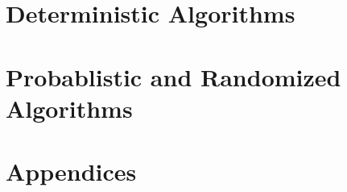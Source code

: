 \documentclass[11pt]{book}
\title{\Title}
\date{}
\author{\Authors}
\theoremstyle{definition}
\begin{document}
\maketitle
\tableofcontents

\part{Deterministic Algorithms}
\begin{multicols}{2}
\end{multicols}

\part{Probablistic and Randomized Algorithms}
\begin{multicols}{2}
  
  
  
  
\end{multicols}

\part{Appendices}
  \appendix

\end{document}
